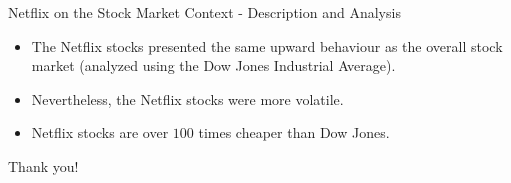 \documentclass{beamer}
\begin{document}
\begin{frame}{Netflix on the Stock Market Context - Description and Analysis}
	\begin{itemize}
		\item The Netflix stocks presented the same upward behaviour as the overall stock market (analyzed using the Dow Jones Industrial Average).
		\item Nevertheless, the Netflix stocks were more volatile.
		\item Netflix stocks are over $100$ times cheaper than Dow Jones.
	\end{itemize}
\end{frame}

\begin{frame}[standout]
	\huge{Thank you!}
\end{frame}
\end{document}
